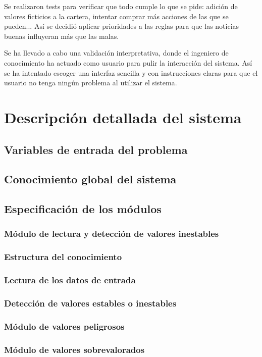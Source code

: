 \documentclass[a4paper, 11pt, titlepage]{article}
\theoremstyle{definition}
\begin{document}
  Se realizaron tests para verificar que todo cumple lo que se pide: adición de
  valores ficticios a la cartera, intentar comprar más acciones de las que se
  pueden... Así se decidió aplicar prioridades a las reglas para que las noticias
  buenas influyeran más que las malas.

  Se ha llevado a cabo una validación interpretativa, donde el ingeniero de
  conocimiento ha actuado como usuario para pulir la interacción del sistema.
  Así se ha intentado escoger una interfaz sencilla y con instrucciones claras
  para que el usuario no tenga ningún problema al utilizar el sistema.

  
  \section{Descripción detallada del sistema}
  \subsection{Variables de entrada del problema}
  \subsection{Conocimiento global del sistema}
  \subsection{Especificación de los módulos}
  \subsubsection{Módulo de lectura y detección de valores inestables}
  \subsubsection*{Estructura del conocimiento}
  \subsubsection*{Lectura de los datos de entrada}
  \subsubsection*{Detección de valores estables o inestables}
  \subsubsection{Módulo de valores peligrosos}
  \subsubsection{Módulo de valores sobrevalorados}
\end{document}
